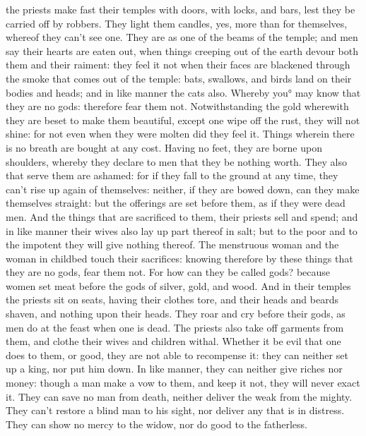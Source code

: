 {{} the priests make fast their temples with doors, with locks, and bars, lest they be carried off by robbers.
They light them candles, yes, more than for themselves, whereof they can’t see one.
They are as one of the beams of the temple; and men say their hearts are eaten out, when things creeping out of the earth devour both them and their raiment: they feel it not
when their faces are blackened through the smoke that comes out of the temple:
bats, swallows, and birds land on their bodies and heads; and in like manner the cats also.
Whereby you° may know that they are no gods: therefore fear them not.
Notwithstanding the gold wherewith they are beset to make them beautiful, except one wipe off the rust, they will not shine: for not even when they were molten did they feel it.
Things wherein there is no breath are bought at any cost.
Having no feet, they are borne upon shoulders, whereby they declare to men that they be nothing worth.
They also that serve them are ashamed: for if they fall to the ground at any time, they can’t rise up again of themselves: neither, if they are bowed down, can they make themselves straight: but the offerings are set before them, as if they were dead men.
And the things that are sacrificed to them, their priests sell and spend; and in like manner their wives also lay up part thereof in salt; but to the poor and to the impotent they will give nothing thereof.
The menstruous woman and the woman in childbed touch their sacrifices: knowing therefore by these things that they are no gods, fear them not.
For how can they be called gods? because women set meat before the gods of silver, gold, and wood.
And in their temples the priests
 sit on seats, having their clothes tore, and their heads and beards shaven, and nothing upon their heads.
They roar and cry before their gods, as men do at the feast when one is dead.
The priests also take off garments from them, and clothe their wives and children withal.
Whether it be evil that one does to them, or good, they are not able to recompense it: they can neither set up a king, nor put him down.
In like manner, they can neither give riches nor money: though a man make a vow to them, and keep it not, they will never exact it.
They can save no man from death, neither deliver the weak from the mighty.
They can’t restore a blind man to his sight, nor deliver any that is in distress.
They can show no mercy to the widow, nor do good to the fatherless.
}
